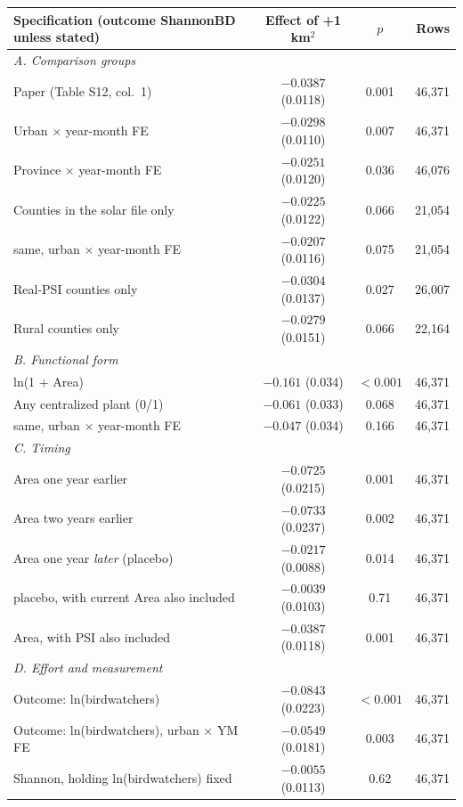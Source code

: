 \documentclass[11pt]{article}
\begin{document}
\begin{center}
\small
\begin{tabular}{l c c r}
\toprule
Specification (outcome ShannonBD unless stated) & Effect of +1 km$^2$ & $p$ & Rows \\
\midrule
\multicolumn{4}{l}{\textit{A. Comparison groups}}\\
Paper (Table S12, col.\ 1) & $-0.0387$ (0.0118) & 0.001 & 46,371 \\
Urban $\times$ year-month FE & $-0.0298$ (0.0110) & 0.007 & 46,371 \\
Province $\times$ year-month FE & $-0.0251$ (0.0120) & 0.036 & 46,076 \\
Counties in the solar file only & $-0.0225$ (0.0122) & 0.066 & 21,054 \\
\quad same, urban $\times$ year-month FE & $-0.0207$ (0.0116) & 0.075 & 21,054 \\
Real-PSI counties only & $-0.0304$ (0.0137) & 0.027 & 26,007 \\
Rural counties only & $-0.0279$ (0.0151) & 0.066 & 22,164 \\
\multicolumn{4}{l}{\textit{B. Functional form}}\\
ln(1 + Area) & $-0.161$ (0.034) & $<0.001$ & 46,371 \\
Any centralized plant (0/1) & $-0.061$ (0.033) & 0.068 & 46,371 \\
\quad same, urban $\times$ year-month FE & $-0.047$ (0.034) & 0.166 & 46,371 \\
\multicolumn{4}{l}{\textit{C. Timing}}\\
Area one year earlier & $-0.0725$ (0.0215) & 0.001 & 46,371 \\
Area two years earlier & $-0.0733$ (0.0237) & 0.002 & 46,371 \\
Area one year \emph{later} (placebo) & $-0.0217$ (0.0088) & 0.014 & 46,371 \\
\quad placebo, with current Area also included & $-0.0039$ (0.0103) & 0.71 & 46,371 \\
Area, with PSI also included & $-0.0387$ (0.0118) & 0.001 & 46,371 \\
\multicolumn{4}{l}{\textit{D. Effort and measurement}}\\
Outcome: ln(birdwatchers) & $-0.0843$ (0.0223) & $<0.001$ & 46,371 \\
Outcome: ln(birdwatchers), urban $\times$ YM FE & $-0.0549$ (0.0181) & 0.003 & 46,371 \\
Shannon, holding ln(birdwatchers) fixed & $-0.0055$ (0.0113) & 0.62 & 46,371 \\

\end{tabular}
\end{center}
\end{document}
